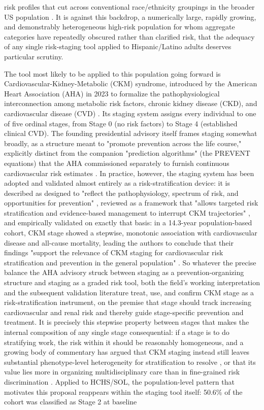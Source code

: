 \documentclass[11pt]{article}
\begin{document}
risk profiles that cut across conventional race/ethnicity groupings in the broader US population \citep{ding2023uncovering}. It is against this backdrop, a numerically large, rapidly growing, and demonstrably heterogeneous high-risk population for whom aggregate categories have repeatedly obscured rather than clarified risk, that the adequacy of any single risk-staging tool applied to Hispanic/Latino adults deserves particular scrutiny.

The tool most likely to be applied to this population going forward is Cardiovascular-Kidney-Metabolic (CKM) syndrome, introduced by the American Heart Association (AHA) in 2023 to formalize the pathophysiological interconnection among metabolic risk factors, chronic kidney disease (CKD), and cardiovascular disease (CVD) \citep{ndumele2023synopsis}. Its staging system assigns every individual to one of five ordinal stages, from Stage 0 (no risk factors) to Stage 4 (established clinical CVD). The founding presidential advisory itself frames staging somewhat broadly, as a structure meant to "promote prevention across the life course," explicitly distinct from the companion "prediction algorithms" (the PREVENT equations) that the AHA commissioned separately to furnish continuous cardiovascular risk estimates \citep{ndumele2023advisory}. In practice, however, the staging system has been adopted and validated almost entirely as a risk-stratification device: it is described as designed to "reflect the pathophysiology, spectrum of risk, and opportunities for prevention" \citep{bansal2024framework}, reviewed as a framework that "allows targeted risk stratification and evidence-based management to interrupt CKM trajectories" \citep{gunnarsson2025ckm}, and empirically validated on exactly that basis: in a 14.3-year population-based cohort, CKM stage showed a stepwise, monotonic association with cardiovascular disease and all-cause mortality, leading the authors to conclude that their findings "support the relevance of CKM staging for cardiovascular risk stratification and prevention in the general population" \citep{ahanchi2026longterm}. So whatever the precise balance the AHA advisory struck between staging as a prevention-organizing structure and staging as a graded risk tool, both the field's working interpretation and the subsequent validation literature treat, use, and confirm CKM stage as a risk-stratification instrument, on the premise that stage should track increasing cardiovascular and renal risk and thereby guide stage-specific prevention and treatment. It is precisely this stepwise property between stages that makes the internal composition of any single stage consequential: if a stage is to do stratifying work, the risk within it should be reasonably homogeneous, and a growing body of commentary has argued that CKM staging instead still leaves substantial phenotype-level heterogeneity for stratification to resolve \citep{shen2026editorial}, or that its value lies more in organizing multidisciplinary care than in fine-grained risk discrimination \citep{claudel2023stepstep}. Applied to HCHS/SOL, the population-level pattern that motivates this proposal reappears within the staging tool itself: 50.6\% of the cohort was classified as Stage 2 at baseline 
\end{document}
